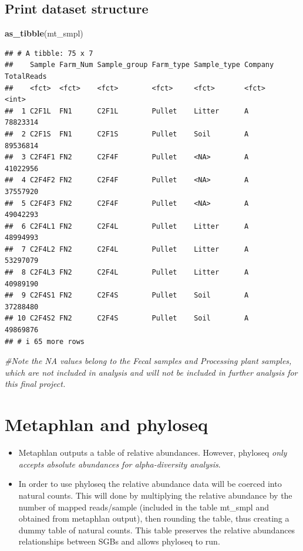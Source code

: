 \documentclass[
]{article}
\newenvironment{Shaded}{\begin{snugshade}}{\end{snugshade}}
\newcommand{\CommentTok}[1]{\textcolor[rgb]{0.56,0.35,0.01}{\textit{#1}}}
\newcommand{\FunctionTok}[1]{\textcolor[rgb]{0.13,0.29,0.53}{\textbf{#1}}}
\newcommand{\NormalTok}[1]{#1}
\begin{document}
\subsection{Print dataset structure}\label{print-dataset-structure}

\begin{Shaded}
\begin{Highlighting}[]
\FunctionTok{as\_tibble}\NormalTok{(mt\_smpl)}
\end{Highlighting}
\end{Shaded}

\begin{verbatim}
## # A tibble: 75 x 7
##    Sample Farm_Num Sample_group Farm_type Sample_type Company TotalReads
##    <fct>  <fct>    <fct>        <fct>     <fct>       <fct>        <int>
##  1 C2F1L  FN1      C2F1L        Pullet    Litter      A         78823314
##  2 C2F1S  FN1      C2F1S        Pullet    Soil        A         89536814
##  3 C2F4F1 FN2      C2F4F        Pullet    <NA>        A         41022956
##  4 C2F4F2 FN2      C2F4F        Pullet    <NA>        A         37557920
##  5 C2F4F3 FN2      C2F4F        Pullet    <NA>        A         49042293
##  6 C2F4L1 FN2      C2F4L        Pullet    Litter      A         48994993
##  7 C2F4L2 FN2      C2F4L        Pullet    Litter      A         53297079
##  8 C2F4L3 FN2      C2F4L        Pullet    Litter      A         40989190
##  9 C2F4S1 FN2      C2F4S        Pullet    Soil        A         37288480
## 10 C2F4S2 FN2      C2F4S        Pullet    Soil        A         49869876
## # i 65 more rows
\end{verbatim}

\begin{Shaded}
\begin{Highlighting}[]
\CommentTok{\#Note the NA values belong to the Fecal samples and Processing plant samples, which are not included in analysis and will not be included in further analysis for this final project.}
\end{Highlighting}
\end{Shaded}

\section{\texorpdfstring{\textbf{Metaphlan and
phyloseq}}{Metaphlan and phyloseq}}\label{metaphlan-and-phyloseq}

\begin{itemize}
\item
  Metaphlan outputs a table of relative abundances. However, phyloseq
  \emph{only accepts absolute abundances for alpha-diversity analysis}.
\item
  In order to use phyloseq the relative abundance data will be coerced
  into natural counts. This will done by multiplying the relative
  abundance by the number of mapped reads/sample (included in the table
  mt\_smpl and obtained from metaphlan output), then rounding the table,
  thus creating a dummy table of natural counts. This table preserves
  the relative abundances relationships between SGBs and allows phyloseq
  to run.
\end{itemize}
\end{document}
